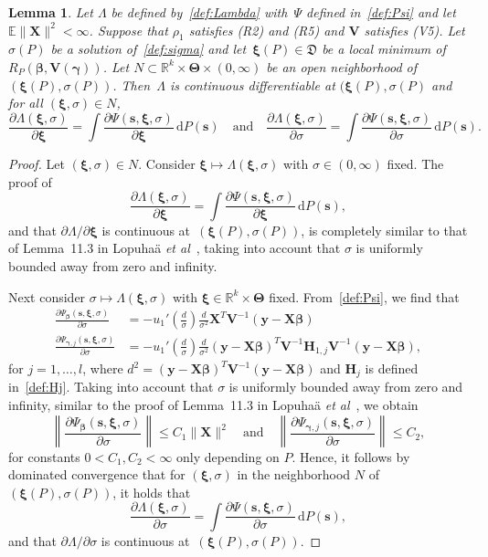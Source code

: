 \documentclass{article}
\numberwithin{equation}{section}
\theoremstyle{plain}
\newtheorem{lemma}{Lemma}
\newcommand{\R}{\mathbb{R}}
\newcommand{\dd}{\mathrm{d}}
\newcommand{\bbeta}{\bm\beta}
\newcommand{\bxi}{\bm\xi}
\newcommand{\bgamma}{\bm\gamma}
\newcommand{\bTheta}{\bm\Theta}
\newcommand{\by}{\mathbf{y}}
\newcommand{\bs}{\mathbf{s}}
\newcommand{\bX}{\mathbf{X}}
\newcommand{\bV}{\mathbf{V}}
\newcommand{\bH}{\mathbf{H}}
\newcommand{\E}{\mathbb{E}}
\begin{document}
\begin{lemma}
\label{lem:change order int diff Lambda}
Let $\Lambda$ be defined by~\eqref{def:Lambda} with~$\Psi$ defined in~\eqref{def:Psi}
and let~$\E\|\bX\|^2<\infty$.
Suppose that $\rho_1$ satisfies (R2) and (R5) and $\bV$ satisfies (V5).
Let $\sigma(P)$ be a solution of~\eqref{def:sigma} and let~$\bxi(P)\in \mathfrak{D}$ be a local minimum of~$R_P(\bbeta,\bV(\bgamma))$.
Let $N\subset \R^k\times \bTheta\times(0,\infty)$ be an open neighborhood of~$(\bxi(P),\sigma(P))$.
Then~$\Lambda$ is continuous differentiable at $(\bxi(P),\sigma(P)$ and
for all $(\bxi,\sigma)\in N$,
\[
\frac{\partial\Lambda(\bxi,\sigma)}{\partial \bxi}
=
\int
\frac{\partial\Psi(\bs,\bxi,\sigma)}{\partial \bxi}\,\dd P(\bs)
\quad\text{and}\quad
\frac{\partial\Lambda(\bxi,\sigma)}{\partial \sigma}
=
\int
\frac{\partial\Psi(\bs,\bxi,\sigma)}{\partial \sigma}\,\dd P(\bs).
\]
\end{lemma}
\begin{proof}
Let $(\bxi,\sigma)\in N$.
Consider $\bxi\mapsto\Lambda(\bxi,\sigma)$ with $\sigma\in(0,\infty)$ fixed.
The proof of
\[
\frac{\partial\Lambda(\bxi,\sigma)}{\partial \bxi}
=
\int
\frac{\partial\Psi(\bs,\bxi,\sigma)}{\partial \bxi}\,\dd P(\bs),
\]
and that $\partial\Lambda/\partial\bxi$ is continuous at~$(\bxi(P),\sigma(P))$, 
is completely similar to that of Lemma~11.3 in Lopuha\"a \emph{et al}~\cite{lopuhaa-gares-ruizgazen2023},
taking into account that $\sigma$ is uniformly bounded away from zero and infinity.

Next consider $\sigma\mapsto\Lambda(\bxi,\sigma)$ with $\bxi\in\R^k\times\bTheta$ fixed. 
From~\eqref{def:Psi}, we find that
\[
\begin{split}
\frac{\partial\Psi_{\bbeta}(\bs,\bxi,\sigma)}{\partial \sigma}
&=
-u_1'\left(\frac{d}{\sigma}\right)\frac{d}{\sigma^2}\bX^T\bV^{-1}(\by-\bX\bbeta)\\
\frac{\partial\Psi_{\bgamma,j}(\bs,\bxi,\sigma)}{\partial \sigma}
&=
-u_1'\left(\frac{d}{\sigma}\right)\frac{d}{\sigma^2}
(\by-\bX\bbeta)^T\bV^{-1}
\bH_{1,j}
\bV^{-1}(\by-\bX\bbeta),
\end{split}
\]
for $j=1,\ldots,l$, where $d^2=(\by-\bX\bbeta)^T\bV^{-1}(\by-\bX\bbeta)$
and $\bH_j$ is defined in~\eqref{def:Hj}.
Taking into account that $\sigma$ is uniformly bounded away from zero and infinity,
similar to the proof of Lemma~11.3 in Lopuha\"a \emph{et al}~\cite{lopuhaa-gares-ruizgazen2023},
we obtain
\[
\left\|
\frac{\partial\Psi_{\bbeta}(\bs,\bxi,\sigma)}{\partial \sigma}
\right\|
\leq
C_1\|\bX\|^2
\quad\text{and}\quad
\left\|
\frac{\partial\Psi_{\bgamma,j}(\bs,\bxi,\sigma)}{\partial \sigma}
\right\|
\leq C_2,
\]
for constants $0<C_1,C_2<\infty$ only depending on $P$.
Hence, it follows by dominated convergence that for $(\bxi,\sigma)$ in the neighborhood $N$
of $(\bxi(P),\sigma(P))$, it holds that
\[
\frac{\partial\Lambda(\bxi,\sigma)}{\partial \sigma}
=
\int
\frac{\partial\Psi(\bs,\bxi,\sigma)}{\partial \sigma}\,\dd P(\bs),
\]
and that $\partial\Lambda/\partial\sigma$ is continuous at~$(\bxi(P),\sigma(P))$.
\end{proof}
\end{document}
